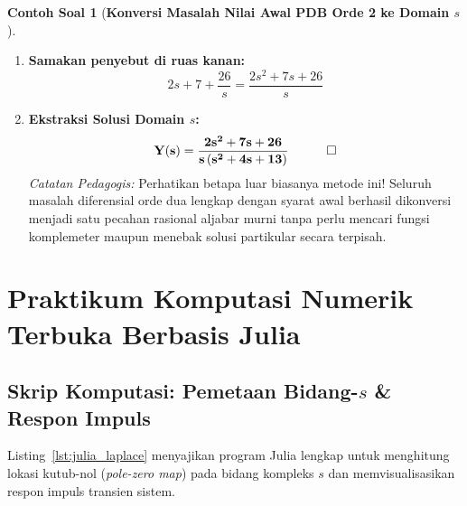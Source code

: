 \documentclass[11pt,a4paper]{article}
\theoremstyle{definition}
\newtheorem{example}{Contoh Soal}[section]
\begin{document}
\begin{example}[\textbf{Konversi Masalah Nilai Awal PDB Orde 2 ke Domain \texorpdfstring{$s$}{s}}]
\begin{enumerate}[leftmargin=*]
    \item \textbf{Samakan penyebut di ruas kanan:}
    \begin{equation*}
        2s + 7 + \frac{26}{s} = \frac{2s^2 + 7s + 26}{s}
    \end{equation*}

    \item \textbf{Ekstraksi Solusi Domain $s$:}
    \begin{equation*}
        \mathbf{Y(s) = \frac{2s^2 + 7s + 26}{s \left( s^2 + 4s + 13 \right)}} \quad \qed
    \end{equation*}
    \textit{Catatan Pedagogis:} Perhatikan betapa luar biasanya metode ini! Seluruh masalah diferensial orde dua lengkap dengan syarat awal berhasil dikonversi menjadi satu pecahan rasional aljabar murni tanpa perlu mencari fungsi komplemeter maupun menebak solusi partikular secara terpisah.
\end{enumerate}
\end{example}

\section{Praktikum Komputasi Numerik Terbuka Berbasis Julia}

\subsection{Skrip Komputasi: Pemetaan Bidang-\texorpdfstring{$s$}{s} \& Respon Impuls}

Listing~\ref{lst:julia_laplace} menyajikan program Julia lengkap untuk menghitung lokasi kutub-nol (\textit{pole-zero map}) pada bidang kompleks $s$ dan memvisualisasikan respon impuls transien sistem.
\end{document}

